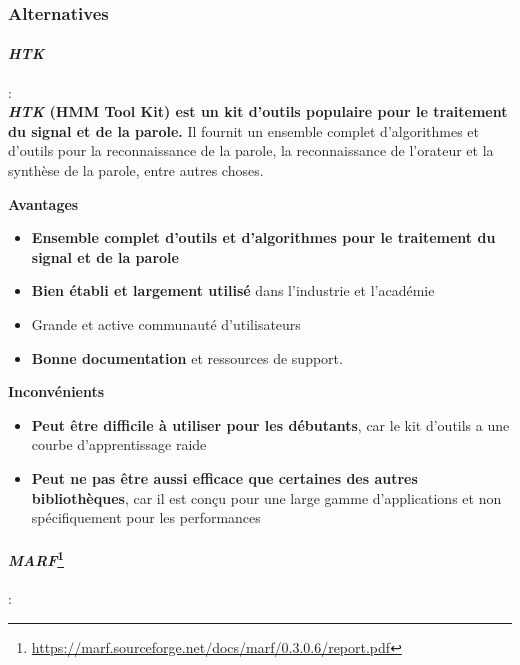 \subsubsection*{Alternatives}

\paragraph*{\textbf{\textit{HTK}}}: \\
\textbf{\textit{HTK} (HMM Tool Kit) est un kit d'outils populaire pour le traitement du signal et de la parole.} Il fournit un ensemble complet d'algorithmes et d'outils
pour la reconnaissance de la parole, la reconnaissance de l'orateur et la synthèse de la parole, entre autres choses.

\textbf{Avantages}
\begin{itemize}
    \item \textbf{Ensemble complet d'outils et d'algorithmes pour le traitement du signal et de la parole}
    \item \textbf{Bien établi et largement utilisé} dans l'industrie et l'académie
    \item Grande et active communauté d'utilisateurs
    \item \textbf{Bonne documentation} et ressources de support.
\end{itemize}


\textbf{Inconvénients}
\begin{itemize}
    \item \textbf{Peut être difficile à utiliser pour les débutants}, car le kit d'outils a une courbe d'apprentissage raide
    \item \textbf{Peut ne pas être aussi efficace que certaines des autres bibliothèques}, car il est conçu pour une large gamme
          d'applications et non spécifiquement pour les performances
\end{itemize}

\paragraph*{\textbf{\textit{MARF}}\footnote{\url{https://marf.sourceforge.net/docs/marf/0.3.0.6/report.pdf}}}:\\


